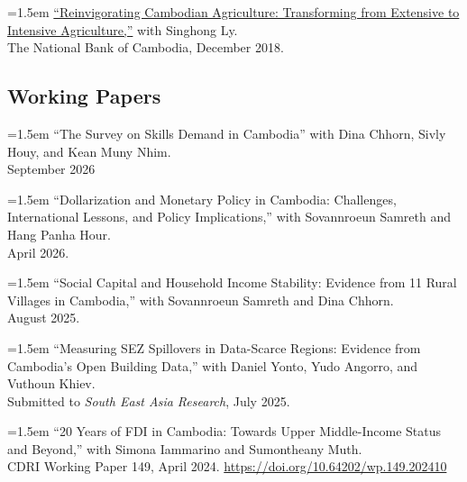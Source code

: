 \documentclass[10pt,a4paper]{article}
\begin{document}
	\hangindent=1.5em
	\href{https://ideas.repec.org/p/pra/mprapa/93086.html}{``Reinvigorating Cambodian Agriculture: Transforming from Extensive to Intensive Agriculture,”} with Singhong Ly. \\
	The National Bank of Cambodia, December 2018. 


\subsection*{Working Papers}

	\hangindent=1.5em
	``The Survey on Skills Demand in Cambodia'' with Dina Chhorn, Sivly Houy, and Kean Muny Nhim.\\ 
	September 2026 \\
	\vspace{-.5em}

		\hangindent=1.5em
	``Dollarization and Monetary Policy in Cambodia:
	Challenges, International Lessons, and Policy Implications,'' with Sovannroeun Samreth and Hang Panha Hour. \\ 
	April 2026. \\
	 \vspace{-.5em}
	
	
	\hangindent=1.5em
	``Social Capital and Household Income Stability: Evidence from 11 Rural Villages in Cambodia,'' with Sovannroeun Samreth and Dina Chhorn. \\ 
	August 2025. \\ \vspace{-.5em}

	\hangindent=1.5em
	``Measuring SEZ Spillovers in Data-Scarce Regions: Evidence from Cambodia's Open Building Data,'' with Daniel Yonto, Yudo Angorro, and Vuthoun Khiev. \\
	Submitted to \textit{South East Asia Research}, July 2025. \\ \vspace{-.5em}
		

	
	\hangindent=1.5em
	``20 Years of FDI in Cambodia: Towards Upper Middle-Income Status and Beyond,'' with Simona Iammarino and Sumontheany Muth. \\
	CDRI Working Paper 149, April 2024. \url{https://doi.org/10.64202/wp.149.202410}\\ \vspace{-.5em}
	
\end{document}
